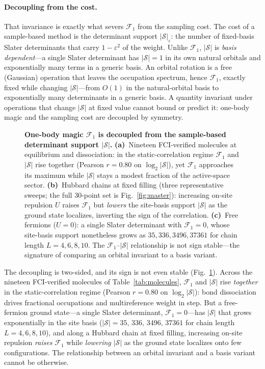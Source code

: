 \paragraph{Decoupling from the cost.} That invariance is exactly what severs $\mathcal F_1$ from the
sampling cost. The cost of a sample-based method is the determinant support $|\mathcal S|_\varepsilon$:
the number of fixed-basis Slater determinants that carry $1-\varepsilon^2$ of the weight. Unlike
$\mathcal F_1$, $|\mathcal S|$ is \emph{basis dependent}---a single Slater determinant has
$|\mathcal S|=1$ in its own natural orbitals and exponentially many terms in a generic basis. An
orbital rotation is a free (Gaussian) operation that leaves the occupation spectrum, hence
$\mathcal F_1$, exactly fixed while changing $|\mathcal S|$---from $O(1)$ in the natural-orbital basis to
exponentially many determinants in a generic basis. A quantity invariant under operations that change
$|\mathcal S|$ at fixed value cannot bound or predict it: one-body magic and the sampling cost are
decoupled by symmetry.

\begin{figure}[t]\centering

\caption{\label{fig:decoupling}\textbf{One-body magic $\mathcal F_1$ is decoupled from the sample-based
determinant support $|\mathcal S|$.} \textbf{(a)}~Nineteen FCI-verified molecules at equilibrium and
dissociation: in the static-correlation regime $\mathcal F_1$ and $|\mathcal S|$ rise together
(Pearson $r=0.80$ on $\log_2|\mathcal S|$), yet $\mathcal F_1$ approaches its maximum while
$|\mathcal S|$ stays a modest fraction of the active-space sector. \textbf{(b)}~Hubbard chains at fixed
filling (three representative sweeps; the full $30$-point set is Fig.~\ref{fig:master}): increasing on-site repulsion $U$ raises $\mathcal F_1$ but \emph{lowers} the site-basis
support $|\mathcal S|$ as the ground state localizes, inverting the sign of the correlation.
\textbf{(c)}~Free fermions ($U=0$): a single Slater determinant with $\mathcal F_1=0$, whose site-basis
support nonetheless grows as $35,336,3496,37361$ for chain length $L=4,6,8,10$. The
$\mathcal F_1$--$|\mathcal S|$ relationship is not sign stable---the signature of comparing an
orbital invariant to a basis variant.}
\end{figure}

The decoupling is two-sided, and its sign is not even stable (Fig.~\ref{fig:decoupling}). Across the
nineteen FCI-verified molecules of Table~\ref{tab:molecules}, $\mathcal F_1$ and $|\mathcal S|$ rise
\emph{together} in the static-correlation regime (Pearson $r=0.80$ on $\log_2|\mathcal S|$): bond
dissociation drives fractional occupations and multireference weight in step. But a free-fermion
ground state---a single Slater determinant, $\mathcal F_1=0$---has $|\mathcal S|$ that grows
exponentially in the site basis ($|\mathcal S|=35,\,336,\,3496,\,37361$ for chain length
$L=4,6,8,10$), and along a Hubbard chain at fixed filling, increasing on-site repulsion \emph{raises}
$\mathcal F_1$ while \emph{lowering} $|\mathcal S|$ as the ground state localizes onto few
configurations. The relationship between an orbital invariant and a basis variant cannot be otherwise.

